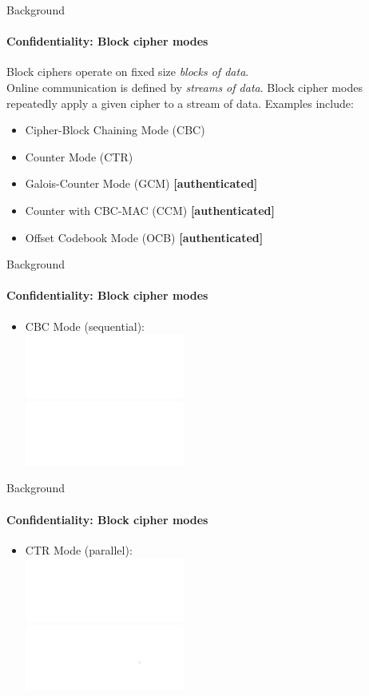 \documentclass[hyperref={draft}]{beamer}
\begin{document}
\begin{frame}{Background}
  \framesubtitle{Confidentiality: Block cipher modes}
  Block ciphers operate on fixed size \emph{blocks of data}.\\
  Online communication is defined by \emph{streams of data}.
  \newline
  \newline
  Block cipher modes repeatedly apply a given cipher to a stream of data.
  Examples include:
  \begin{itemize}
    \item Cipher-Block Chaining Mode (CBC)
    \item Counter Mode (CTR)
    \item Galois-Counter Mode (GCM) \textbf{[authenticated]}
    \item Counter with CBC-MAC (CCM) \textbf{[authenticated]}
    \item Offset Codebook Mode (OCB) \textbf{[authenticated]}
  \end{itemize}
\end{frame}

\begin{frame}{Background}
  \framesubtitle{Confidentiality: Block cipher modes}
  \begin{itemize}
    \item CBC Mode (sequential):\\
    \includegraphics[height=80px]{CBC_encryption}\\
    \includegraphics[height=80px]{CBC_decryption}
  \end{itemize}
\end{frame}

\begin{frame}{Background}
  \framesubtitle{Confidentiality: Block cipher modes}
  \begin{itemize}
    \item CTR Mode (parallel):\\
    \includegraphics[height=80px]{CTR_encryption}\\
    \includegraphics[height=80px]{CTR_decryption}
  \end{itemize}
\end{frame}
\end{document}
